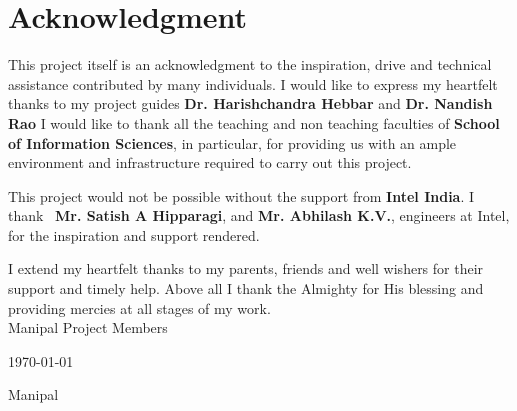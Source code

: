 \documentclass{mainreport}
\begin{document}
\maketitle

\parindent 10mm
\chapter*{Acknowledgment}\label{ack}
{\label{ack} 

\hspace{6mm} This project itself is an acknowledgment to the inspiration, drive and technical
assistance contributed by many individuals. I would like to express my heartfelt thanks to my project guides 
{\bf Dr. Harishchandra Hebbar} and {\bf Dr. Nandish Rao}
I would like to thank all the teaching and non teaching faculties of {\bf School of Information Sciences}, 
in particular, for providing us with an ample environment and
infrastructure required to carry out this project. 

This project would not be possible without the support from {\bf Intel India}. I thank \
{\bf Mr. Satish A Hipparagi}, and {\bf Mr. Abhilash K.V.}, engineers at Intel,
for the inspiration and support rendered.

I extend my heartfelt thanks to my parents, friends and well wishers for their 
support and timely help. Above all I thank the Almighty for His blessing and 
providing mercies at all stages of my work. \\[2cm]




\noindent Manipal \hfill Project Members

\noindent \today \hfill \institutename

 \hfill Manipal





}
\end{document}
